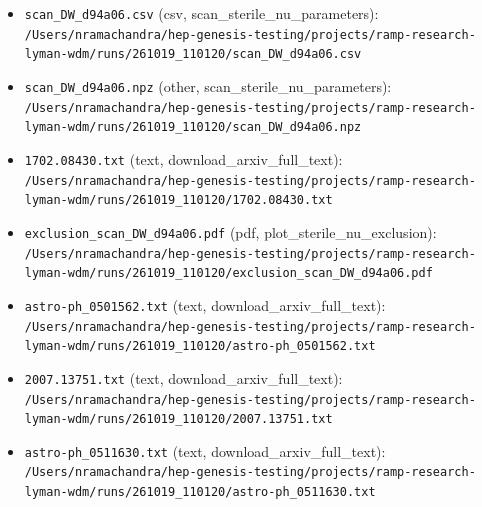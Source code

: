\documentclass[11pt,a4paper]{article}
\begin{document}
\begin{itemize}
  \item \texttt{scan\_\allowbreak{}DW\_\allowbreak{}d94a06.csv} (csv, scan\_sterile\_nu\_parameters): \texttt{/\allowbreak{}Users/\allowbreak{}nramachandra/\allowbreak{}hep-genesis-testing/\allowbreak{}projects/\allowbreak{}ramp-research-lyman-wdm/\allowbreak{}runs/\allowbreak{}261019\_\allowbreak{}110120/\allowbreak{}scan\_\allowbreak{}DW\_\allowbreak{}d94a06.csv}
  \item \texttt{scan\_\allowbreak{}DW\_\allowbreak{}d94a06.npz} (other, scan\_sterile\_nu\_parameters): \texttt{/\allowbreak{}Users/\allowbreak{}nramachandra/\allowbreak{}hep-genesis-testing/\allowbreak{}projects/\allowbreak{}ramp-research-lyman-wdm/\allowbreak{}runs/\allowbreak{}261019\_\allowbreak{}110120/\allowbreak{}scan\_\allowbreak{}DW\_\allowbreak{}d94a06.npz}
  \item \texttt{1702.08430.txt} (text, download\_arxiv\_full\_text): \texttt{/\allowbreak{}Users/\allowbreak{}nramachandra/\allowbreak{}hep-genesis-testing/\allowbreak{}projects/\allowbreak{}ramp-research-lyman-wdm/\allowbreak{}runs/\allowbreak{}261019\_\allowbreak{}110120/\allowbreak{}1702.08430.txt}
  \item \texttt{exclusion\_\allowbreak{}scan\_\allowbreak{}DW\_\allowbreak{}d94a06.pdf} (pdf, plot\_sterile\_nu\_exclusion): \texttt{/\allowbreak{}Users/\allowbreak{}nramachandra/\allowbreak{}hep-genesis-testing/\allowbreak{}projects/\allowbreak{}ramp-research-lyman-wdm/\allowbreak{}runs/\allowbreak{}261019\_\allowbreak{}110120/\allowbreak{}exclusion\_\allowbreak{}scan\_\allowbreak{}DW\_\allowbreak{}d94a06.pdf}
  \item \texttt{astro-ph\_\allowbreak{}0501562.txt} (text, download\_arxiv\_full\_text): \texttt{/\allowbreak{}Users/\allowbreak{}nramachandra/\allowbreak{}hep-genesis-testing/\allowbreak{}projects/\allowbreak{}ramp-research-lyman-wdm/\allowbreak{}runs/\allowbreak{}261019\_\allowbreak{}110120/\allowbreak{}astro-ph\_\allowbreak{}0501562.txt}
  \item \texttt{2007.13751.txt} (text, download\_arxiv\_full\_text): \texttt{/\allowbreak{}Users/\allowbreak{}nramachandra/\allowbreak{}hep-genesis-testing/\allowbreak{}projects/\allowbreak{}ramp-research-lyman-wdm/\allowbreak{}runs/\allowbreak{}261019\_\allowbreak{}110120/\allowbreak{}2007.13751.txt}
  \item \texttt{astro-ph\_\allowbreak{}0511630.txt} (text, download\_arxiv\_full\_text): \texttt{/\allowbreak{}Users/\allowbreak{}nramachandra/\allowbreak{}hep-genesis-testing/\allowbreak{}projects/\allowbreak{}ramp-research-lyman-wdm/\allowbreak{}runs/\allowbreak{}261019\_\allowbreak{}110120/\allowbreak{}astro-ph\_\allowbreak{}0511630.txt}

\end{itemize}
\end{document}
